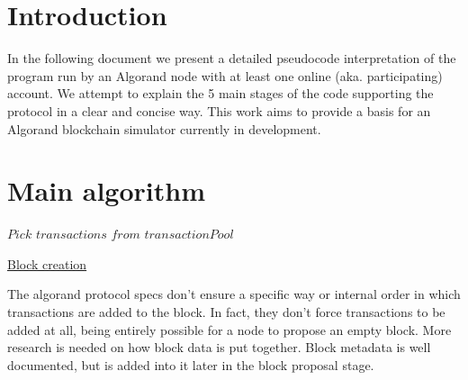 \documentclass[10pt,a4paper]{article}
\begin{document}
\section{Introduction}

In the following document we present a detailed pseudocode interpretation of the program run by an Algorand node with at least one online (aka. participating)
account. We attempt to explain the 5 main stages of the code supporting the protocol in a clear and concise way.
This work aims to provide a basis for an Algorand blockchain simulator currently in development.

\section{Main algorithm}


\begin{algorithm}
    \begin{algorithmic}[1]
    
    \State $Pick$ $transactions$ $from$ $transactionPool$
    
    \EndFunction
    \end{algorithmic}
    \caption{\underline{Block creation}}
    \label{alg:fuerza_bruta}
\end{algorithm}

The algorand protocol specs don't ensure a specific way or internal order in which transactions are added to the block.
In fact, they don't force transactions to be added at all, being entirely possible for a node to propose an empty block.
More research is needed on how block data is put together.
Block metadata is well documented, but is added into it later in the block proposal stage.
\end{document}
